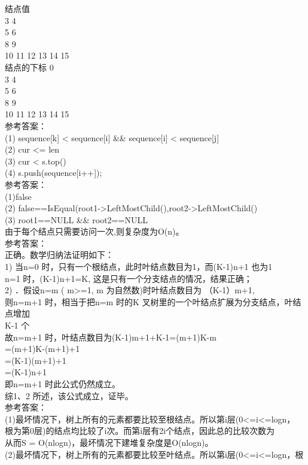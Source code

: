 \begin{question}
\begin{solution}
结点值\\
3 4\\
5 6\\
8 9\\
10 11 12 13 14 15\\
结点的下标 0\\
3 4\\
5 6\\
8 9\\
10 11 12 13 14 15\\
参考答案：\\
(1) sequence[k] < sequence[i] \&\& sequence[i] < sequence[j]\\
(2) cur <= len\\
(3) cur < s.top()\\
(4) s.push(sequence[i++]);\\
参考答案：\\
(1)false\\
(2) false==IsEqual(root1->LeftMostChild(),root2->LeftMostChild()\\
(3) root1==NULL \&\& root2==NULL\\
由于每个结点只需要访问一次,则复杂度为O(n)。\\
参考答案：\\
正确。数学归纳法证明如下：\\
1) 当n=0 时，只有一个根结点，此时叶结点数目为1，而(K-1)n+1 也为1\\
n=1 时，(K-1)n+1=K, 这是只有一个分支结点的情况，结果正确；\\
2) ．假设n=m ( m>=1, m 为自然数)时叶结点数目为 （K-1）m+1,\\
则n=m+1 时，相当于把n=m 时的K 叉树里的一个叶结点扩展为分支结点，叶结点增加\\
K-1 个\\
故n=m+1 时，叶结点数目为(K-1)m+1+K-1=(m+1)K-m\\
=(m+1)K-(m+1)+1\\
=(K-1)(m+1)+1\\
=(K-1)n+1\\
即n=m+1 时此公式仍然成立。\\
综1、2 所述，该公式成立，证毕。\\
参考答案：\\
(1)最坏情况下，树上所有的元素都要比较至根结点。所以第i层(0<=i<=logn，\\
根为第0层)的结点均比较了i次。而第i层有2i个结点，因此总的比较次数为\\
从而S = O(nlogn)，最坏情况下建堆复杂度是O(nlogn)。\\
(2)最坏情况下，树上所有的元素都要比较至叶结点。所以第i层(0<=i<=logn，根\\

\end{solution}
\end{question}
